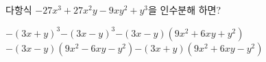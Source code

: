 다항식 $-27x^3+27x^2y-9xy^2+y^3$을 인수분해 하면?
\begin{choicesv}{$-(3x+y)^3$}{$-(3x-y)^3$}{$-(3x-y)(9x^2+6xy+y^2)$}{$-(3x-y)(9x^2-6xy-y^2)$}{$-(3x+y)(9x^2+6xy-y^2)$}\end{choicesv}

